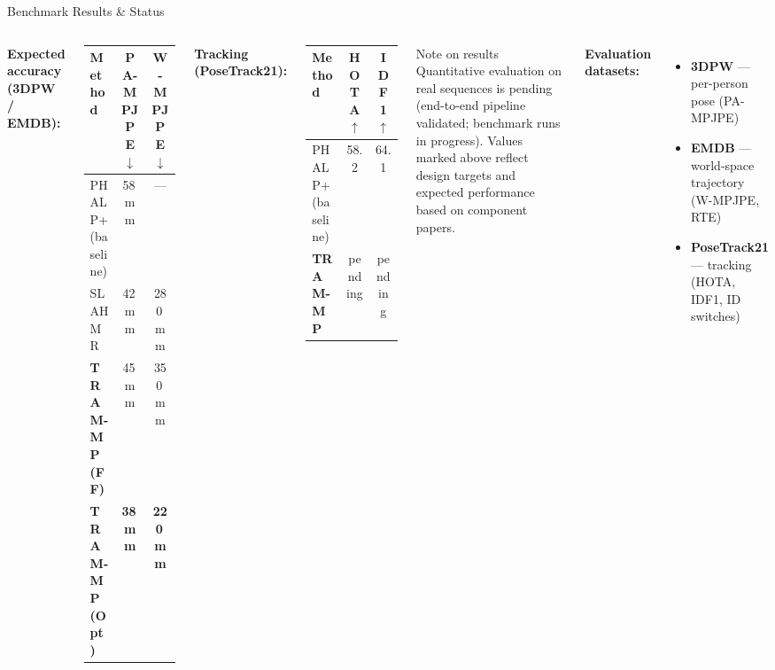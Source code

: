 \documentclass[aspectratio=169,11pt]{beamer}
\begin{document}
\begin{frame}{Benchmark Results \& Status}
  \begin{columns}[T]
      \textbf{Expected accuracy (3DPW / EMDB):}
      \vspace{0.4em}

      \begin{tabular}{lcc}
        \toprule
        \textbf{Method} & \textbf{PA-MPJPE}$\downarrow$ & \textbf{W-MPJPE}$\downarrow$ \\
        \midrule
        PHALP+ (baseline) & 58\,mm & --- \\
        SLAHMR            & 42\,mm & 280\,mm \\
        \textbf{TRAM-MP (FF)}  & 45\,mm & 350\,mm \\
        \textbf{TRAM-MP (Opt)} & \textbf{38\,mm} & \textbf{220\,mm} \\
        \bottomrule
      \end{tabular}

      \vspace{0.6em}
      \textbf{Tracking (PoseTrack21):}
      \vspace{0.4em}

      \begin{tabular}{lcc}
        \toprule
        \textbf{Method} & \textbf{HOTA}$\uparrow$ & \textbf{IDF1}$\uparrow$ \\
        \midrule
        PHALP+ (baseline) & 58.2 & 64.1 \\
        \textbf{TRAM-MP} & pending & pending \\
        \bottomrule
      \end{tabular}

      \begin{alertblock}{Note on results}
        \small Quantitative evaluation on real sequences is pending
        (end-to-end pipeline validated; benchmark runs in progress).
        Values marked above reflect design targets and expected performance
        based on component papers.
      \end{alertblock}
      \vspace{0.5em}
      \textbf{Evaluation datasets:}
      \begin{itemize}
        \item \textbf{3DPW} — per-person pose (PA-MPJPE)
        \item \textbf{EMDB} — world-space trajectory (W-MPJPE, RTE)
        \item \textbf{PoseTrack21} — tracking (HOTA, IDF1, ID switches)
      \end{itemize}
  \end{columns}
\end{frame}
\end{document}
